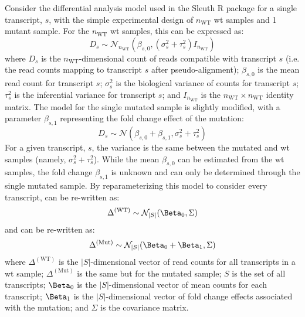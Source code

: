 Consider the differential analysis model used in the Sleuth R package \cite{pimentelDifferentialAnalysisRNAseq2017,yiGenelevelDifferentialAnalysis2018} for a single transcript, $s$, with the simple experimental design of $n_\mathrm{WT}$ \gls{wt} samples and 1 mutant sample.
For the $n_\mathrm{WT}$ \gls{wt} samples, this can be expressed as:
%
\begin{equation}
  D_s \sim \mathcal{N}_{n_\mathrm{WT}} \left( \beta_{s,0}, (\sigma_s^2 + \tau_s^2)I_{n_\mathrm{WT}} \right)
  \label{eqn:wt_model}
\end{equation}
%
where $D_s$ is the $n_\mathrm{WT}$-dimensional count of reads compatible with transcript $s$ (i.e. the read counts mapping to transcript $s$ after pseudo-alignment); $\beta_{s,0}$ is the mean read count for transcript $s$; $\sigma_s^2$ is the biological variance of counts for transcript $s$; $\tau_s^2$ is the inferential variance for transcript $s$; and $I_{n_\mathrm{WT}}$ is the ${n_\mathrm{WT}} \times {n_\mathrm{WT}}$ identity matrix.
The model for the single mutated sample is slightly modified, with a parameter $\beta_{s,1}$ representing the fold change effect of the mutation:
%
\begin{equation}
  D_s \sim \mathcal{N} \left( \beta_{s, 0} + \beta_{s, 1}, \sigma_s^2 + \tau_s^2 \right)
  \label{eqn:single_mut_model}
\end{equation}
%
For a given transcript, $s$, the variance is the same between the mutated and \gls{wt} samples (namely, $\sigma_s^2 + \tau_s^2$).
While the mean $\beta_{s, 0}$ can be estimated from the \gls{wt} samples, the fold change $\beta_{s, 1}$ is unknown and can only be determined through the single mutated sample.
By reparameterizing this model to consider every transcript,  can be re-written as:
%
\begin{equation}
  \Delta^{(\mathrm{WT})} \sim \mathcal{N}_{|S|}(\Beta_0, \Sigma) \\
  \label{eqn:delta_wt}
\end{equation}
%
and  can be re-written as:
%
\begin{equation}
  \Delta^{(\mathrm{Mut})} \sim \mathcal{N}_{|S|}(\Beta_0 + \Beta_1, \Sigma) \\
  \label{eqn:delta_mut}
\end{equation}
%
where $\Delta^{(\mathrm{WT})}$ is the $|S|$-dimensional vector of read counts for all transcripts in a \gls{wt} sample; $\Delta^{(\mathrm{Mut})}$ is the same but for the mutated sample; $S$ is the set of all transcripts; $\Beta_0$ is the $|S|$-dimensional vector of mean counts for each transcript; $\Beta_1$ is the $|S|$-dimensional vector of fold change effects associated with the mutation; and $\Sigma$ is the covariance matrix.
